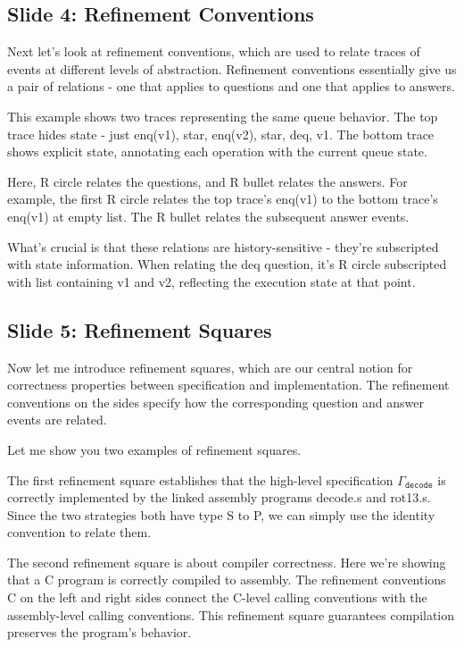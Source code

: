 \documentclass{article}
\newcommand{\kw}[1]{\ensuremath{\mathtt{#1}}}
\begin{document}
\subsection{Slide 4: Refinement Conventions}

Next let's look at refinement conventions, which are used to relate traces of
events at different levels of abstraction. Refinement conventions essentially
give us a pair of relations - one that applies to questions and one that applies
to answers.

This example shows two traces representing the same queue behavior. The top
trace hides state - just enq(v1), star, enq(v2), star, deq, v1. The bottom trace
shows explicit state, annotating each operation with the current queue state.

Here, R circle relates the questions, and R bullet relates the answers. For
example, the first R circle relates the top trace's enq(v1) to the bottom
trace's enq(v1) at empty list. The R bullet relates the subsequent answer events.

What's crucial is that these relations are history-sensitive - they're
subscripted with state information. When relating the deq question, it's R
circle subscripted with list containing v1 and v2, reflecting the execution
state at that point.

\subsection{Slide 5: Refinement Squares}

Now let me introduce refinement squares, which are our central notion for
correctness properties between specification and implementation. The refinement
conventions on the sides specify how the corresponding question and answer
events are related.

Let me show you two examples of refinement squares.

The first refinement square establishes that the high-level specification
$\Gamma_\kw{decode}$ is correctly implemented by the linked assembly programs
decode.s and rot13.s. Since the two strategies both have type S to P,
we can simply use the identity convention to relate them.

The second refinement square is about compiler correctness. Here we're showing
that a C program is correctly compiled to assembly. The refinement conventions C
on the left and right sides connect the C-level calling conventions with the
assembly-level calling conventions. This refinement square guarantees
compilation preserves the program's behavior.
\end{document}
